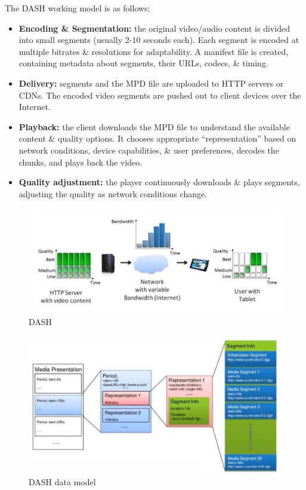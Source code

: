 \documentclass[a4paper,11pt]{article}
\begin{document}
The DASH working model is as follows:
\begin{itemize}
    \item   \textbf{Encoding \& Segmentation:} the original video/audio content is divided into small segments (usually 2-10 seconds each).
            Each segment is encoded at multiple bitrates \& resolutions for adaptability.
            A manifest file is created, containing metadata about segments, their URLs, codecs, \& timing.

    \item   \textbf{Delivery:} segments and the MPD file are uploaded to HTTP servers or CDNs.
            The encoded video segments are pushed out to client devices over the Internet.

    \item   \textbf{Playback:} the client downloads the MPD file to understand the available content \& quality options.
        It chooses appropriate ``representation'' based on network conditions, device capabilities, \& user preferences, decodes the chunks, and plays back the video.

    \item   \textbf{Quality adjustment:} the player continuously downloads \& plays segments, adjusting the quality as network conditions change.
\end{itemize}

\begin{figure}[H]
    \centering
    \includegraphics[width=\textwidth]{./images/dash.png}
    \caption{DASH}
\end{figure}


\begin{figure}[H]
    \centering
    \includegraphics[width=\textwidth]{./images/dashdatamodel.png}
    \caption{DASH data model}
\end{figure}
\end{document}
